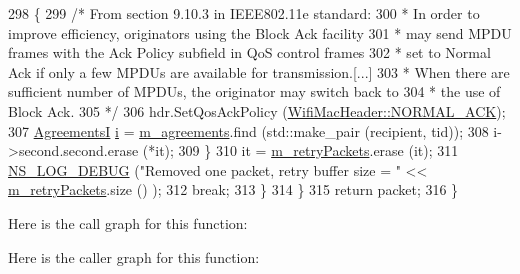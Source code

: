 \begin{DoxyCode}
298             \{
299               \textcolor{comment}{/* From section 9.10.3 in IEEE802.11e standard:}
300 \textcolor{comment}{               * In order to improve efficiency, originators using the Block Ack facility}
301 \textcolor{comment}{               * may send MPDU frames with the Ack Policy subfield in QoS control frames}
302 \textcolor{comment}{               * set to Normal Ack if only a few MPDUs are available for transmission.[...]}
303 \textcolor{comment}{               * When there are sufficient number of MPDUs, the originator may switch back to}
304 \textcolor{comment}{               * the use of Block Ack.}
305 \textcolor{comment}{               */}
306               hdr.SetQosAckPolicy (\hyperlink{classns3_1_1WifiMacHeader_ae3a382482f357972019f5e1b3162adc4a9f52b9c6ca65d046ce2be9d70bce28cf}{WifiMacHeader::NORMAL\_ACK});
307               \hyperlink{classns3_1_1BlockAckManager_acbd1cf7c5f3487150955c3a4c9d04102}{AgreementsI} \hyperlink{bernuolliDistribution_8m_a6f6ccfcf58b31cb6412107d9d5281426}{i} = \hyperlink{classns3_1_1BlockAckManager_a952a6b8b29705c83ba6464f7cf7ffe66}{m\_agreements}.find (std::make\_pair (recipient, tid));
308               i->second.second.erase (*it);
309             \}
310           it = \hyperlink{classns3_1_1BlockAckManager_a2851f947dd68945ebc25961cff893ed9}{m\_retryPackets}.erase (it);
311           \hyperlink{group__logging_ga413f1886406d49f59a6a0a89b77b4d0a}{NS\_LOG\_DEBUG} (\textcolor{stringliteral}{"Removed one packet, retry buffer size = "} << 
      \hyperlink{classns3_1_1BlockAckManager_a2851f947dd68945ebc25961cff893ed9}{m\_retryPackets}.size () );
312           \textcolor{keywordflow}{break};
313         \}
314     \}
315   \textcolor{keywordflow}{return} packet;
316 \}
\end{DoxyCode}


Here is the call graph for this function\+:




Here is the caller graph for this function\+:


